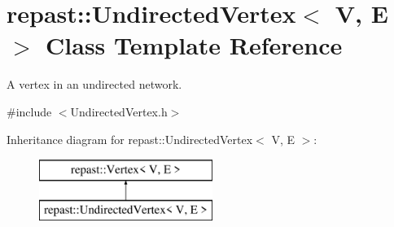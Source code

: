 \hypertarget{classrepast_1_1_undirected_vertex}{\section{repast\-:\-:Undirected\-Vertex$<$ V, E $>$ Class Template Reference}
\label{classrepast_1_1_undirected_vertex}
}


A vertex in an undirected network.  




{\ttfamily \#include $<$Undirected\-Vertex.\-h$>$}

Inheritance diagram for repast\-:\-:Undirected\-Vertex$<$ V, E $>$\-:\begin{figure}[H]
\begin{center}
\leavevmode
\includegraphics[height=2.000000cm]{classrepast_1_1_undirected_vertex}
\end{center}
\end{figure}
